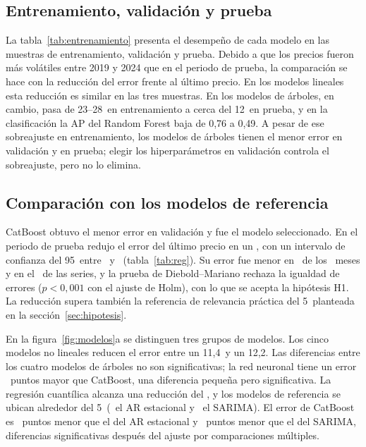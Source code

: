 \subsection{Entrenamiento, validación y prueba}

La tabla~\ref{tab:entrenamiento} presenta el desempeño de cada modelo en las muestras de entrenamiento, validación y prueba. Debido a que los precios fueron más volátiles entre 2019 y 2024 que en el periodo de prueba, la comparación se hace con la reducción del error frente al último precio. En los modelos lineales esta reducción es similar en las tres muestras. En los modelos de árboles, en cambio, pasa de 23--28\pct\ en entrenamiento a cerca del 12\pct\ en prueba, y en la clasificación la AP del Random Forest baja de 0,76 a 0,49. A pesar de ese sobreajuste en entrenamiento, los modelos de árboles tienen el menor error en validación y en prueba; elegir los hiperparámetros en validación controla el sobreajuste, pero no lo elimina.



\subsection{Comparación con los modelos de referencia}

CatBoost obtuvo el menor error en validación y fue el modelo seleccionado. En el periodo de prueba redujo el error del último precio en un \cmeje\pct, con un intervalo de confianza del 95\pct\ entre \cmejloe\pct\ y \cmejhie\pct\ (tabla~\ref{tab:reg}). Su error fue menor en \cmesesgana\ de los \cnmeses\ meses y en el \cseriese\pct\ de las series, y la prueba de Diebold--Mariano rechaza la igualdad de errores ($p<0{,}001$ con el ajuste de Holm), con lo que se acepta la hipótesis H1. La reducción supera también la referencia de relevancia práctica del 5\pct\ planteada en la sección~\ref{sec:hipotesis}.



En la figura~\ref{fig:modelos}a se distinguen tres grupos de modelos. Los cinco modelos no lineales reducen el error entre un 11,4\pct\ y un 12,2\pct. Las diferencias entre los cuatro modelos de árboles no son significativas; la red neuronal tiene un error \cdmlp\ puntos mayor que CatBoost, una diferencia pequeña pero significativa. La regresión cuantílica alcanza una reducción del \cmejlin\pct, y los modelos de referencia se ubican alrededor del 5\pct\ (\cmejar\pct\ el AR estacional y \cmejsar\pct\ el SARIMA). El error de CatBoost es \cdar\ puntos menor que el del AR estacional y \cdsar\ puntos menor que el del SARIMA, diferencias significativas después del ajuste por comparaciones múltiples.

